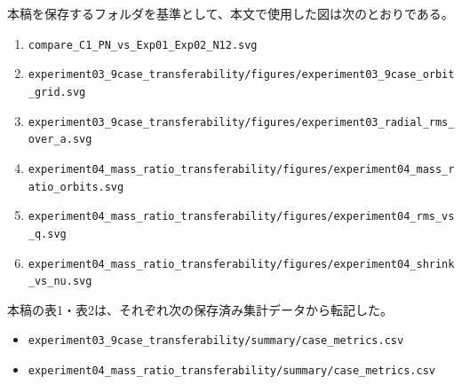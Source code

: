 \documentclass[
  a4paper,
]{ltjsarticle}
\providecommand{\tightlist}{%
  \setlength{\itemsep}{0pt}\setlength{\parskip}{0pt}}
\begin{document}
本稿を保存するフォルダを基準として、本文で使用した図は次のとおりである。

\begin{enumerate}
\def\labelenumi{\arabic{enumi}.}
\tightlist
\item
  \texttt{compare\_C1\_PN\_vs\_Exp01\_Exp02\_N12.svg}
\item
  \texttt{experiment03\_9case\_transferability/figures/experiment03\_9case\_orbit\_grid.svg}
\item
  \texttt{experiment03\_9case\_transferability/figures/experiment03\_radial\_rms\_over\_a.svg}
\item
  \texttt{experiment04\_mass\_ratio\_transferability/figures/experiment04\_mass\_ratio\_orbits.svg}
\item
  \texttt{experiment04\_mass\_ratio\_transferability/figures/experiment04\_rms\_vs\_q.svg}
\item
  \texttt{experiment04\_mass\_ratio\_transferability/figures/experiment04\_shrink\_vs\_nu.svg}
\end{enumerate}

本稿の表1・表2は、それぞれ次の保存済み集計データから転記した。

\begin{itemize}
\tightlist
\item
  \texttt{experiment03\_9case\_transferability/summary/case\_metrics.csv}
\item
  \texttt{experiment04\_mass\_ratio\_transferability/summary/case\_metrics.csv}
\end{itemize}
\end{document}

